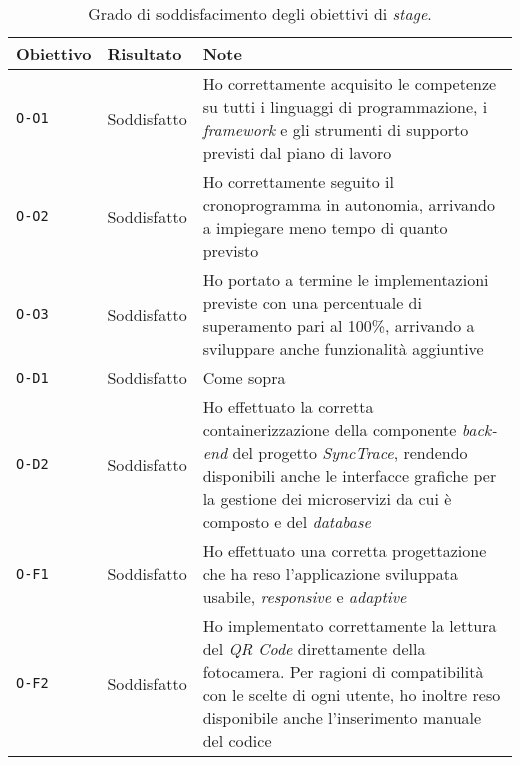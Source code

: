 \begin{table}[h]
  \label{tab:grado-soddisfacimento}
  \begin{center}
\begin{tabular}{llp{8cm}}
\textbf{Obiettivo}         & \textbf{Risultato}               & \textbf{Note}            \\ \hline
\multicolumn{1}{|l|}{\texttt{O-O1}} & \multicolumn{1}{l|}{Soddisfatto} & \multicolumn{1}{p{8cm}|}{Ho correttamente acquisito le competenze su tutti i linguaggi di programmazione, i \textit{framework} e gli strumenti di supporto previsti dal piano di lavoro} \\ \hline
\multicolumn{1}{|l|}{\texttt{O-O2}} & \multicolumn{1}{l|}{Soddisfatto} & \multicolumn{1}{p{8cm}|}{Ho correttamente seguito il cronoprogramma in autonomia, arrivando a impiegare meno tempo di quanto previsto} \\ \hline
\multicolumn{1}{|l|}{\texttt{O-O3}} & \multicolumn{1}{l|}{Soddisfatto} & \multicolumn{1}{p{8cm}|}{Ho portato a termine le implementazioni previste con una percentuale di superamento pari al 100\%, arrivando a sviluppare anche funzionalità aggiuntive} \\ \hline
\multicolumn{1}{|l|}{\texttt{O-D1}} & \multicolumn{1}{l|}{Soddisfatto} & \multicolumn{1}{p{8cm}|}{Come sopra} \\ \hline
\multicolumn{1}{|l|}{\texttt{O-D2}} & \multicolumn{1}{l|}{Soddisfatto} & \multicolumn{1}{p{8cm}|}{Ho effettuato la corretta containerizzazione della componente \textit{back-end} del progetto \textit{SyncTrace}, rendendo disponibili anche le interfacce grafiche per la gestione dei microservizi da cui è composto e del \textit{database}} \\ \hline
\multicolumn{1}{|l|}{\texttt{O-F1}} & \multicolumn{1}{l|}{Soddisfatto} & \multicolumn{1}{p{8cm}|}{Ho effettuato una corretta progettazione che ha reso l'applicazione sviluppata usabile, \textit{responsive} e \textit{adaptive}} \\ \hline
\multicolumn{1}{|l|}{\texttt{O-F2}} & \multicolumn{1}{l|}{Soddisfatto} & \multicolumn{1}{p{8cm}|}{Ho implementato correttamente la lettura del \textit{QR Code} direttamente della fotocamera. Per ragioni di compatibilità con le scelte di ogni utente, ho inoltre reso disponibile anche l'inserimento manuale del codice} \\ \hline
\end{tabular}
\end{center}
\caption{Grado di soddisfacimento degli obiettivi di \textit{stage}.}
\end{table}

